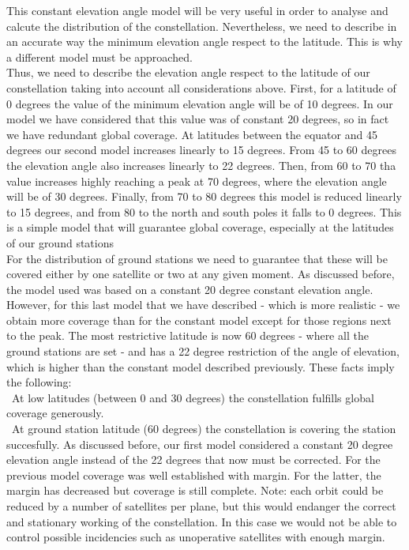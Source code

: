 This constant elevation angle model will be very useful in order to analyse and calcute the distribution of the constellation. Nevertheless, we need to describe in an accurate way the minimum elevation angle respect to the latitude. This is why a different model must be approached. \\

Thus, we need to describe the elevation angle respect to the latitude of our constellation taking into account all considerations above. First, for a latitude of 0 degrees the value of the minimum elevation angle will be of 10 degrees. In our model we have considered that this value was of constant 20 degrees, so in fact we have redundant global coverage. At latitudes between the equator and 45 degrees our second model increases linearly to 15 degrees. From 45 to 60 degrees the elevation angle also increases linearly to 22 degrees. Then, from 60 to 70 tha value increases highly reaching a peak at 70 degrees, where the elevation angle will be of 30 degrees. Finally, from 70 to 80 degrees this model is reduced linearly to 15 degrees, and from 80 to the north and south poles it falls to 0 degrees. This is a simple model that will guarantee global coverage, especially at the latitudes of our ground stations \\

For the distribution of ground stations we need to guarantee that these will be covered either by one satellite or two at any given moment. As discussed before, the model used was based on a constant 20 degree constant elevation angle. However, for this last model that we have described - which is more realistic - we obtain more coverage than for the constant model except for those regions next to the peak. The most restrictive latitude is now 60 degrees - where all the ground stations are set - and has a 22 degree restriction of the angle of elevation, which is higher than the constant model described previously. These facts imply the following: \\

\textendash\  At low latitudes (between 0 and 30 degrees) the constellation fulfills global coverage generously. \\

\textendash\ At ground station latitude (60 degrees) the constellation is covering the station succesfully. As discussed before, our first model considered a constant 20 degree elevation angle instead of the 22 degrees that now must be corrected. For the previous model coverage was well established with margin. For the latter, the margin has decreased but coverage is still complete. Note: each orbit could be reduced by a number of satellites per plane, but this would endanger the correct and stationary working of the constellation. In this case we would not be able to control possible incidencies such as unoperative satellites with enough margin. \\

